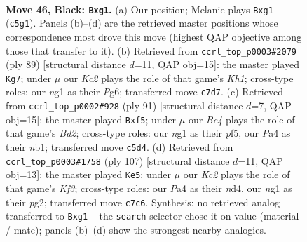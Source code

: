 \documentclass[11pt]{article}
\begin{document}
\clearpage

\begin{figure}[p]\centering
\begin{subfigure}{0.46\textwidth}\centering
\resizebox{\linewidth}{!}{%
\newchessgame
\chessboard[
  setfen={8/2k5/6p1/2b3P1/p1b2K2/8/8/6N1 b - - 2 46},
  showmover=false,
  pgfstyle=straightmove, color=movearrow, markmove={c5-g1}
]}
\caption{}
\end{subfigure}\hfill
\begin{subfigure}{0.46\textwidth}\centering
\resizebox{\linewidth}{!}{%
\newchessgame
\chessboard[
  setfen={7k/5B2/6p1/1p4b1/3PK3/7P/8/8 b - - 1 45},
  showmover=false,
  pgfstyle=straightmove, color=movearrow, markmove={h8-g7}
]}
\caption{}
\end{subfigure}
\\[4pt]
\begin{subfigure}{0.46\textwidth}\centering
\resizebox{\linewidth}{!}{%
\newchessgame
\chessboard[
  setfen={5k2/3b4/8/5Pp1/8/6KP/8/1N6 b - - 0 46},
  showmover=false,
  pgfstyle=straightmove, color=movearrow, markmove={d7-f5}
]}
\caption{}
\end{subfigure}\hfill
\begin{subfigure}{0.46\textwidth}\centering
\resizebox{\linewidth}{!}{%
\newchessgame
\chessboard[
  setfen={8/8/5k2/7p/3Nb2P/8/5KP1/8 b - - 16 54},
  showmover=false,
  pgfstyle=straightmove, color=movearrow, markmove={f6-e5}
]}
\caption{}
\end{subfigure}
\caption{\textbf{Move 46, Black: \texttt{Bxg1}.} (a) Our position; Melanie plays \texttt{Bxg1} (\texttt{c5g1}). Panels (b)--(d) are the retrieved master positions whose correspondence most drove this move (highest QAP objective among those that transfer to it). (b) Retrieved from \texttt{ccrl\_top\_p0003\#2079} (ply 89) [structural distance $d$=11, QAP obj=15]: the master played \texttt{Kg7}; under $\mu$ our \emph{Kc2} plays the role of that game's \emph{Kh1}; cross-type roles: our \emph{n}g1 as their \emph{P}g6; transferred move \texttt{c7d7}. (c) Retrieved from \texttt{ccrl\_top\_p0002\#928} (ply 91) [structural distance $d$=7, QAP obj=15]: the master played \texttt{Bxf5}; under $\mu$ our \emph{Bc4} plays the role of that game's \emph{Bd2}; cross-type roles: our \emph{n}g1 as their \emph{p}f5, our \emph{P}a4 as their \emph{n}b1; transferred move \texttt{c5d4}. (d) Retrieved from \texttt{ccrl\_top\_p0003\#1758} (ply 107) [structural distance $d$=11, QAP obj=13]: the master played \texttt{Ke5}; under $\mu$ our \emph{Kc2} plays the role of that game's \emph{Kf3}; cross-type roles: our \emph{P}a4 as their \emph{n}d4, our \emph{n}g1 as their \emph{p}g2; transferred move \texttt{c7c6}. Synthesis: no retrieved analog transferred to \texttt{Bxg1} -- the \texttt{search} selector chose it on value (material / mate); panels (b)--(d) show the strongest nearby analogies.}
\label{fig:thought-m91}
\end{figure}
\end{document}
